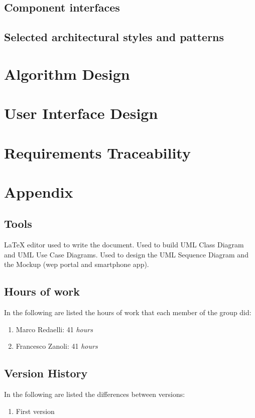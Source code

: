 \documentclass{../Common/Structure/doc_pdf}
\begin{document}
\section{Component interfaces}

\section{Selected architectural styles and patterns}


\chapter{Algorithm Design}

\chapter{User Interface Design}

\chapter{Requirements Traceability}


\appendix
\chapter{Appendix}

\section{Tools}
\begin{itemize}
	 \LaTeX{} editor used to write the document.
	 Used to build UML Class Diagram and UML Use Case Diagrams.
	 Used to design the UML Sequence Diagram and the Mockup (wep portal and smartphone app).
\end{itemize}
\newpage
\section{Hours of work}
In the following are listed the hours of work that each member of the group did:
\begin{enumerate}
	\item Marco Redaelli: 41 \emph{hours}
	\item Francesco Zanoli: 41 \emph{hours}
\end{enumerate}
\newpage
\section{Version History}
In the following are listed the differences between versions:
\begin{enumerate}
	\item First version
\end{enumerate}
\end{document}
